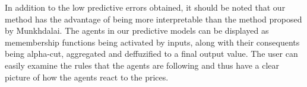 ﻿\documentclass{ieeeaccess}
\begin{document}







In addition to the low predictive errors obtained, it should be noted
that our method has the advantage of being more interpretable than the
method proposed by Munkhdalai. The agents in our predictive models can
be displayed as memembership functions being activated by inputs,
along with their consequents being alpha-cut, aggregated and
deffuzified to a final output value. The user can easily examine the
rules that the agents are following and thus have a clear picture of
how the agents react to the prices.
\end{document}
